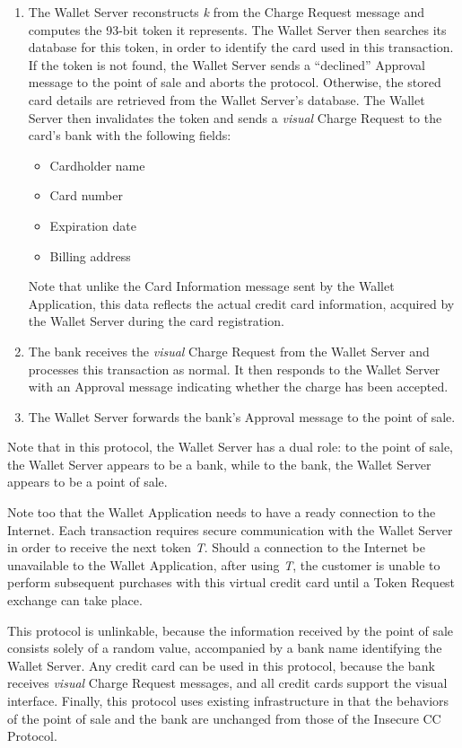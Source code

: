 \begin{enumerate}
\item The Wallet Server reconstructs \emph{k} from the Charge Request message and computes the 93-bit token it represents.
    The Wallet Server then searches its database for this token, in order to identify the card used in this transaction.
    If the token is not found, the Wallet Server sends a ``declined'' Approval message to the point of sale and aborts the protocol.
    Otherwise, the stored card details are retrieved from the Wallet Server's database.
    The Wallet Server then invalidates the token and sends a \emph{visual} Charge Request to the card's bank with the following fields:
    \begin{itemize}
    \item Cardholder name
    \item Card number
    \item Expiration date
    \item Billing address
    \end{itemize}
    Note that unlike the Card Information message sent by the Wallet Application, this data reflects the actual credit card information,
        acquired by the Wallet Server during the card registration.

\item The bank receives the \emph{visual} Charge Request from the Wallet Server and processes this transaction as normal.
    It then responds to the Wallet Server with an Approval message indicating whether the charge has been accepted.

\item The Wallet Server forwards the bank's Approval message to the point of sale.
\end{enumerate}

Note that in this protocol, the Wallet Server has a dual role:
to the point of sale, the Wallet Server appears to be a bank, while to the bank, the Wallet Server appears to be a point of sale.

Note too that the Wallet Application needs to have a ready connection to the Internet.
Each transaction requires secure communication with the Wallet Server in order to receive the next token \emph{T}.
Should a connection to the Internet be unavailable to the Wallet Application,
    after using \emph{T}, the customer is unable to perform subsequent purchases with this virtual credit card until a Token Request exchange can take place.

This protocol is unlinkable,
    because the information received by the point of sale consists solely of a random value, accompanied by a bank name identifying the Wallet Server.
Any credit card can be used in this protocol,
    because the bank receives \emph{visual} Charge Request messages, and all credit cards support the visual interface.
Finally, this protocol uses existing infrastructure in that the behaviors of the point of sale and the bank are unchanged from those of the Insecure CC Protocol.
